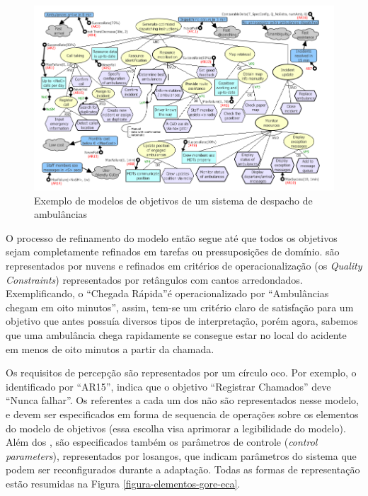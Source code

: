 \begin{figure}[h]
	\centering
	\includegraphics[width=1\textwidth]{figuras/modelos/ACAD-Completo.png}
	\caption{Exemplo de modelos de objetivos de um sistema de despacho de ambulâncias ~\cite{tesevitor}}
	\label{figura-acad-completo}
\end{figure}

O processo de refinamento do modelo então segue até que todos os objetivos sejam completamente refinados em tarefas ou pressuposições de domínio. \sofgoals são representados por nuvens e refinados em critérios de operacionalização (os \textit{Quality Constraints}) representados por retângulos com cantos arredondados. Exemplificando, o \sofgoal ``Chegada Rápida''é operacionalizado por ``Ambulâncias chegam em oito minutos'', assim, tem-se um critério claro de satisfação para um objetivo que antes possuía diversos tipos de interpretação, porém agora, sabemos que uma ambulância chega rapidamente se consegue estar no local do acidente em menos de oito minutos a partir da chamada.

Os requisitos de percepção são representados por um círculo oco. Por exemplo, o \awreq identificado por ``AR15'', indica que o objetivo ``Registrar Chamados'' deve ``Nunca falhar''. Os \evoreqs referentes a cada um dos \awreqs não são representados nesse modelo, e devem ser especificados em forma de sequencia de operações sobre os elementos do modelo de objetivos (essa escolha visa aprimorar a legibilidade do modelo). Além dos \awreqs, são especificados também os parâmetros de controle (\textit{control parameters}), representados por losangos, que indicam parâmetros do sistema que podem ser reconfigurados durante a adaptação. Todas as formas de representação estão resumidas na Figura \ref{figura-elementos-gore-eca}.

